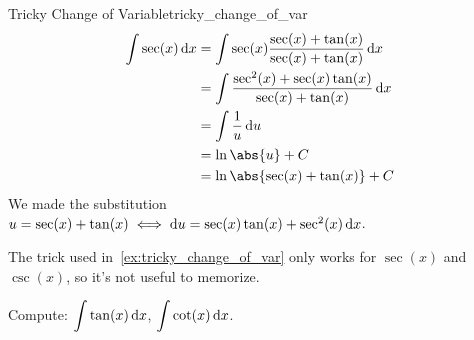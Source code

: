 \begin{Example}{Tricky Change of Variable}{tricky_change_of_var}
    \begin{align*}
        \int \sec(x)\odif{x}
         & =\int \sec(x)\frac{\sec(x)+\tan(x)}{\sec(x)+\tan(x)}\odif{x}    \\
         & =\int \frac{\sec^2(x)+\sec(x)\tan(x)}{\sec(x)+\tan(x)} \odif{x} \\
         & =\int \frac{1}{u}\odif{u}                                       \\
         & =\ln\abs{u}+C                                                   \\
         & =\ln\abs{\sec(x)+\tan(x)}+C
    \end{align*}
    We made the substitution $ u=\sec(x)+\tan(x)\iff \odif{u}=\sec(x)\tan(x)+\sec^2(x)\odif{x} $.
\end{Example}

\begin{Remark}{}{}
    The trick used in~\ref{ex:tricky_change_of_var} only works for $ \sec(x) $ and
    $ \csc(x) $, so it's not useful to memorize.
\end{Remark}

\begin{Exercise}{}{}
    Compute:
    $ \displaystyle\int \tan(x)\odif{x} $, $ \displaystyle\int \cot(x)\odif{x} $.
\end{Exercise}
